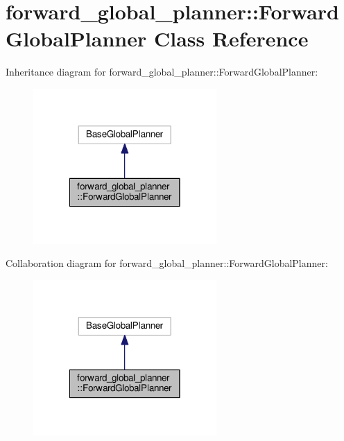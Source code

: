 \hypertarget{classforward__global__planner_1_1ForwardGlobalPlanner}{\section{forward\-\_\-global\-\_\-planner\-:\-:Forward\-Global\-Planner Class Reference}
\label{classforward__global__planner_1_1ForwardGlobalPlanner}
}


Inheritance diagram for forward\-\_\-global\-\_\-planner\-:\-:Forward\-Global\-Planner\-:
\nopagebreak
\begin{figure}[H]
\begin{center}
\leavevmode
\includegraphics[width=198pt]{classforward__global__planner_1_1ForwardGlobalPlanner__inherit__graph}
\end{center}
\end{figure}


Collaboration diagram for forward\-\_\-global\-\_\-planner\-:\-:Forward\-Global\-Planner\-:
\nopagebreak
\begin{figure}[H]
\begin{center}
\leavevmode
\includegraphics[width=198pt]{classforward__global__planner_1_1ForwardGlobalPlanner__coll__graph}
\end{center}
\end{figure}
